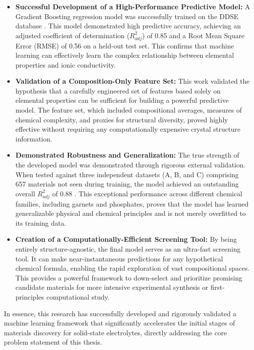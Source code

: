 \begin{itemize}
    \item \textbf{Successful Development of a High-Performance Predictive Model:} A Gradient Boosting regression model was successfully trained on the DDSE database \cite{DDSE2021}. This model demonstrated high predictive accuracy, achieving an adjusted coefficient of determination (\(R^2_{adj}\)) of 0.85 and a Root Mean Square Error (RMSE) of 0.56 on a held-out test set. This confirms that machine learning can effectively learn the complex relationship between elemental properties and ionic conductivity.

    \item \textbf{Validation of a Composition-Only Feature Set:} This work validated the hypothesis that a carefully engineered set of features based solely on elemental properties can be sufficient for building a powerful predictive model. The feature set, which included compositional averages, measures of chemical complexity, and proxies for structural diversity, proved highly effective without requiring any computationally expensive crystal structure information.

    \item \textbf{Demonstrated Robustness and Generalization:} The true strength of the developed model was demonstrated through rigorous external validation. When tested against three independent datasets (A, B, and C) comprising 657 materials not seen during training, the model achieved an outstanding overall \(R^2_{adj}\) of 0.88 \cite{Famprikis2019, Miara2015, Sendek2017}. This exceptional performance across different chemical families, including garnets and phosphates, proves that the model has learned generalizable physical and chemical principles and is not merely overfitted to its training data.

    \item \textbf{Creation of a Computationally-Efficient Screening Tool:} By being entirely structure-agnostic, the final model serves as an ultra-fast screening tool. It can make near-instantaneous predictions for any hypothetical chemical formula, enabling the rapid exploration of vast compositional spaces. This provides a powerful framework to down-select and prioritize promising candidate materials for more intensive experimental synthesis or first-principles computational study.
\end{itemize}

In essence, this research has successfully developed and rigorously validated a machine learning framework that significantly accelerates the initial stages of materials discovery for solid-state electrolytes, directly addressing the core problem statement of this thesis.


